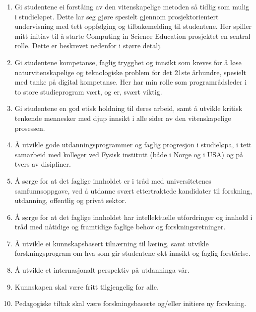 \documentclass[aps,floatfix,preprint]{revtex4-1}
\begin{document}
\begin{enumerate}
\item Gi studentene ei forståing av den vitenskapelige metoden så tidlig som mulig i studieløpet. Dette lar seg gjøre spesielt gjennom prosjektorientert undervisning med tett oppfølging og tilbakemelding til studentene. Her spiller mitt initiav til å starte Computing in Science Education prosjektet en sentral rolle. Dette er beskrevet nedenfor i større detalj.  

\item Gi studentene kompetanse, faglig trygghet  og innsikt som kreves for å løse naturvitenskapelige og teknologiske problem for det 21ste århundre, spesielt med tanke på digital kompetanse. Her har min rolle som programrådsleder i to store studieprogram vært, og er, svært viktig. 

\item Gi studentene en god etisk holdning til deres arbeid, samt å utvikle kritisk tenkende mennesker med djup innsikt i alle sider av den vitenskapelige prosessen.

\item Å utvikle gode utdanningsprogrammer og faglig progresjon i studieløpa, i tett samarbeid med kolleger ved Fysisk institutt (både i Norge og i USA) og  på tvers av disipliner.

\item Å sørge for at det faglige innholdet er i tråd med universitetenes samfunnsoppgave, ved å utdanne svært ettertraktede kandidater til forskning, utdanning, offentlig og privat sektor.

\item Å sørge for at det faglige innholdet har intellektuelle utfordringer og innhold i tråd med nåtidige og framtidige faglige behov og forskningsretninger. 

\item Å utvikle ei kunnskapsbasert tilnærning til læring, samt utvikle forskningsprogram om hva som gir studentene økt innsikt og faglig forståelse. 

\item Å utvikle et internasjonalt perspektiv på utdanninga vår.

\item Kunnskapen skal være fritt tilgjengelig for alle.

\item Pedagogiske tiltak skal være forskningsbaserte og/eller initiere ny forskning.
\end{enumerate}
\end{document}
